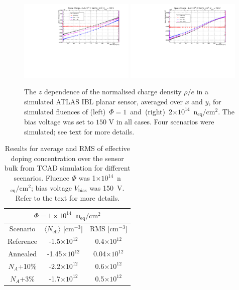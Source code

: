 \begin{figure}[!htpb]
\centering
\includegraphics[width=0.49\textwidth]{TCAD_SpaceCharge_variations_1e14_150V.pdf}
\includegraphics[width=0.49\textwidth]{TCAD_SpaceCharge_variations_2e14_150V.pdf}
\caption{\label{fig:NeffTCADAnnealing}The $z$ dependence of the normalised charge density $\rho/e$ in a simulated ATLAS IBL planar sensor, averaged over $x$ and $y$, for  simulated
  fluences of (left)~$\Phi=1$~and~(right)~2$\times10^{14}$~n$_\text{eq}/\text{cm}^{2}$. The bias voltage was set to $150$ V in all cases. Four scenarios were simulated; see text for more 
  details.}
\end{figure}


\begin{table}[htbp]
   \centering
   \begin{tabular}{ccc} 
      \hline
            \multicolumn{3}{c}{$\Phi=1\times10^{14}$~n$_\text{eq}/\text{cm}^{2}$  } \\
      \hline 
        Scenario  & $\langle N_\text{eff}\rangle$ [cm$^{-3}$] & RMS [cm$^{-3}$] \\
      \hline
      \hline
       Reference &  -1.5$\times10^{12}$ & 0.4$\times10^{12}$  \\
 Annealed   & -1.45$\times10^{12}$ & 0.04$\times10^{12}$ \\
 $N_A$+10\% &  -2.2$\times10^{12}$ & 0.6$\times10^{12}$  \\
 $N_A$+3\% &  -1.7$\times10^{12}$ & 0.5$\times10^{12}$  \\
      \hline
         \end{tabular}
   \caption{\label{tab:TCADNeffHamburg1}Results for average and RMS of effective doping concentration over the sensor bulk from TCAD simulation for different scenarios. 
Fluence $\Phi$ was 1$\times10^{14}$~n$_\text{eq}/\text{cm}^{2}$; bias voltage $V_\text{bias}$ 
was 150~V.  Refer to the text for more details.}
\end{table}




